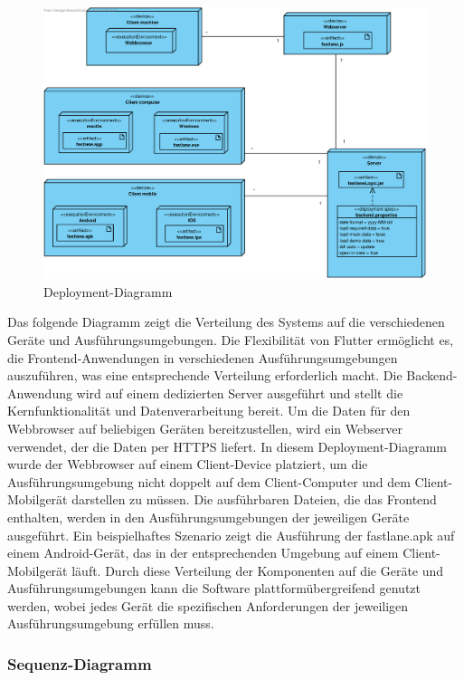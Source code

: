 \begin{figure} [H]
    \centering
    \includegraphics[width=1\textwidth]{pictures/Fastlane_Deployment_Diagram}
    \caption{Deployment-Diagramm}
    \label{fig:Deployment-Diagram}
\end{figure}

\bigskip


Das folgende Diagramm zeigt die Verteilung des Systems auf die verschiedenen Geräte und Ausführungsumgebungen.
Die Flexibilität von Flutter ermöglicht es, die Frontend-Anwendungen in verschiedenen Ausführungsumgebungen auszuführen, was eine entsprechende Verteilung erforderlich macht.
Die Backend-Anwendung wird auf einem dedizierten Server ausgeführt und stellt die Kernfunktionalität und Datenverarbeitung bereit.
Um die Daten für den Webbrowser auf beliebigen Geräten bereitzustellen, wird ein Webserver verwendet, der die Daten per HTTPS liefert.
In diesem Deployment-Diagramm wurde der Webbrowser auf einem Client-Device platziert, um die Ausführungsumgebung nicht doppelt auf dem Client-Computer und dem Client-Mobilgerät darstellen zu müssen.
Die ausführbaren Dateien, die das Frontend enthalten, werden in den Ausführungsumgebungen der jeweiligen Geräte ausgeführt.
Ein beispielhaftes Szenario zeigt die Ausführung der fastlane.apk auf einem Android-Gerät, das in der entsprechenden Umgebung auf einem Client-Mobilgerät läuft.
Durch diese Verteilung der Komponenten auf die Geräte und Ausführungsumgebungen kann die Software plattformübergreifend genutzt werden, wobei jedes Gerät die spezifischen Anforderungen der jeweiligen Ausführungsumgebung erfüllen muss.

\bigskip

\subsubsection{Sequenz-Diagramm}

